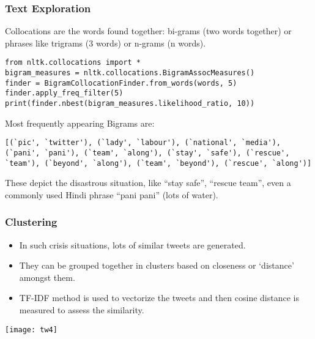 \begin{frame}[fragile]\frametitle{Text Exploration}
Collocations are the words found together:  bi-grams (two words together) or phrases like trigrams (3 words) or n-grams (n words).
  \begin{lstlisting}
from nltk.collocations import *
bigram_measures = nltk.collocations.BigramAssocMeasures()
finder = BigramCollocationFinder.from_words(words, 5)
finder.apply_freq_filter(5)
print(finder.nbest(bigram_measures.likelihood_ratio, 10))
  \end{lstlisting}
  Most frequently appearing Bigrams are:
  \begin{lstlisting}
[(`pic', `twitter'), (`lady', `labour'), (`national', `media'), (`pani', `pani'), (`team', `along'), (`stay', `safe'), (`rescue', `team'), (`beyond', `along'), (`team', `beyond'), (`rescue', `along')]
  \end{lstlisting}
These depict the disastrous situation, like ``stay safe'', ``rescue team'', even a commonly used Hindi phrase ``pani pani'' (lots of water).
\end{frame}

\begin{frame}[fragile]\frametitle{Clustering}
  \begin{itemize}
  \item In such crisis situations, lots of similar tweets are generated.
  \item They can be grouped together in clusters based on closeness or `distance' amongst them. 
  \item TF-IDF method is used to vectorize the tweets and then cosine distance is measured to assess the similarity.
  \end{itemize}
  \begin{center}
\texttt{[image: tw4]}
\end{center}
\end{frame}

